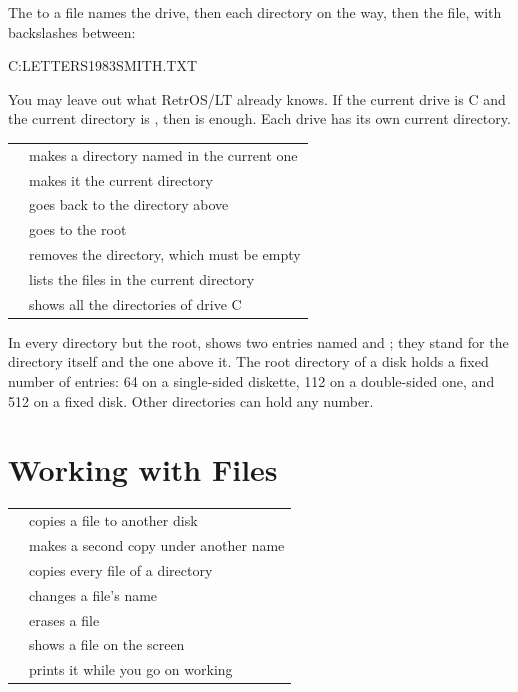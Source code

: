 The  to a file names the drive, then each directory on the way,
then the file, with backslashes between:

\begin{dialogue}
C:\bs{}LETTERS\bs{}1983\bs{}SMITH.TXT
\end{dialogue}

You may leave out what RetrOS/LT already knows. If the current drive is C
and the current directory is , then
 is enough. Each drive has its own current directory.

\begin{tabularx}{\textwidth}{@{}P{1.6in}X@{}}
\toprule
{} & makes a directory named  in the current one\\
 & makes it the current directory\\
 & goes back to the directory above\\
 & goes to the root\\
 & removes the directory, which must be empty\\
 & lists the files in the current directory\\
 & shows all the directories of drive C\\
\bottomrule
\end{tabularx}

In every directory but the root,  shows two entries named
 and ; they stand for the directory itself and the one
above it. The root directory of a disk holds a fixed number of entries:
64 on a single-sided diskette, 112 on a double-sided one, and 512 on a
fixed disk. Other directories can hold any number.

\section{Working with Files}

\begin{tabularx}{\textwidth}{@{}P{2.2in}X@{}}
\toprule
{} & copies a file to another disk\\
 & makes a second copy under another name\\
 & copies every file of a directory\\
 & changes a file's name\\
 & erases a file\\
 & shows a file on the screen\\
 & prints it while you go on working\\
\bottomrule
\end{tabularx}

